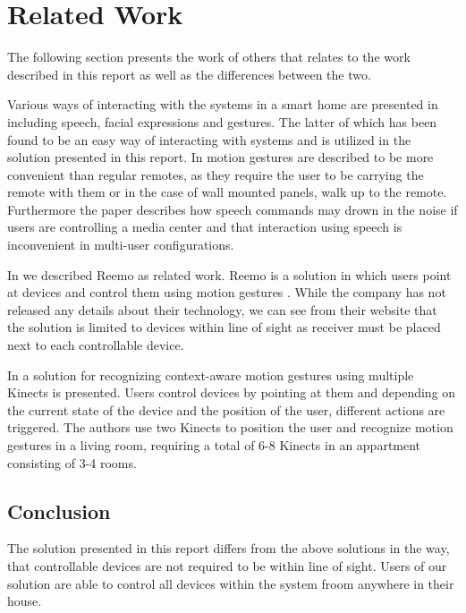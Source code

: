 \section{Related Work}
\label{sec:related-work}

The following section presents the work of others that relates to the work described in this report as well as the differences between the two.

Various ways of interacting with the systems in a smart home are presented in \cite[pp. 9-10]{cook2007smart} including speech, facial expressions and gestures. The latter of which has been found to be an easy way of interacting with systems \cite[p. 6]{rahman2011motion} and is utilized in the solution presented in this report. In \cite[pp. 2-3]{starner2000gesture} motion gestures are described to be more convenient than regular remotes, as they require the user to be carrying the remote with them or in the case of wall mounted panels, walk up to the remote. Furthermore the paper describes how speech commands may drown in the noise if users are controlling a media center and that interaction using speech is inconvenient in multi-user configurations.

In \cite[pp. 9-11]{prespecialisation} we described Reemo as related work. Reemo is a solution in which users point at devices and control them using motion gestures \cite{reemo:about}. While the company has not released any details about their technology, we can see from their website that the solution is limited to devices within line of sight as receiver must be placed next to each controllable device.

In \cite{caon2011context} a solution for recognizing context-aware motion gestures using multiple Kinects is presented. Users control devices by pointing at them and depending on the current state of the device and the position of the user, different actions are triggered.
The authors use two Kinects to position the user and recognize motion gestures in a living room, requiring a total of 6-8 Kinects in an appartment consisting of 3-4 rooms.

\subsection{Conclusion}

The solution presented in this report differs from the above solutions in the way, that controllable devices are not required to be within line of sight. Users of our solution are able to control all devices within the system froom anywhere in their house.

